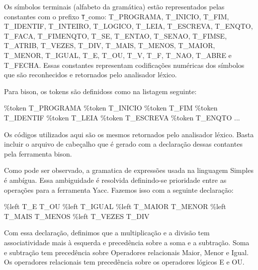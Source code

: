 \documentclass[
  brazilian,
  letterpaper,
]{book}
\newenvironment{Shaded}{\begin{snugshade}}{\end{snugshade}}
\newcommand{\NormalTok}[1]{\textcolor[rgb]{0.00,0.23,0.31}{#1}}
\newcommand{\OperatorTok}[1]{\textcolor[rgb]{0.37,0.37,0.37}{#1}}
\theoremstyle{plain}
\theoremstyle{definition}
\theoremstyle{remark}
\begin{document}
Os símbolos terminais (alfabeto da gramática) estão representados pelas
constantes com o prefixo \texttt{T\_}como: T\_PROGRAMA, T\_INICIO,
T\_FIM, T\_IDENTIF, T\_INTEIRO, T\_LOGICO, T\_LEIA, T\_ESCREVA,
T\_ENQTO, T\_FACA, T\_FIMENQTO, T\_SE, T\_ENTAO, T\_SENAO, T\_FIMSE,
T\_ATRIB, T\_VEZES, T\_DIV, T\_MAIS, T\_MENOS, T\_MAIOR, T\_MENOR,
T\_IGUAL, T\_E, T\_OU, T\_V, T\_F, T\_NAO, T\_ABRE e T\_FECHA. Essas
constantes representam codificações numéricas dos símbolos que são
reconhecidos e retornados pelo analisador léxico.

Para bison, os tokens são definidoss como na listagem seguinte:

\begin{Shaded}
\begin{Highlighting}[]
\OperatorTok{\%}\NormalTok{token T\_PROGRAMA}
\OperatorTok{\%}\NormalTok{token T\_INICIO}
\OperatorTok{\%}\NormalTok{token T\_FIM}
\OperatorTok{\%}\NormalTok{token T\_IDENTIF}
\OperatorTok{\%}\NormalTok{token T\_LEIA}
\OperatorTok{\%}\NormalTok{token T\_ESCREVA}
\OperatorTok{\%}\NormalTok{token T\_ENQTO}
\OperatorTok{...}
\end{Highlighting}
\end{Shaded}

Os códigos utilizados aqui são os mesmos retornados pelo analisador
léxico. Basta incluir o arquivo de cabeçalho que é gerado com a
declaração dessas contantes pela ferramenta bison.

Como pode ser observado, a gramatica de expressões usada na linguagem
Simples é ambígua. Essa ambiguidade é resolvida definindo-se prioridade
entre as operações para a ferramenta Yacc. Fazemos isso com a seguinte
declaração:

\begin{Shaded}
\begin{Highlighting}[]
\OperatorTok{\%}\NormalTok{left T\_E T\_OU}
\OperatorTok{\%}\NormalTok{left T\_IGUAL}
\OperatorTok{\%}\NormalTok{left T\_MAIOR T\_MENOR}
\OperatorTok{\%}\NormalTok{left T\_MAIS T\_MENOS}
\OperatorTok{\%}\NormalTok{left T\_VEZES T\_DIV}
\end{Highlighting}
\end{Shaded}

Com essa declaração, definimos que a multiplicação e a divisão tem
associatividade mais à esquerda e precedência sobre a soma e a
subtração. Soma e subtração tem precedência sobre Operadores relacionais
Maior, Menor e Igual. Os operadores relacionais tem precedência sobre os
operadores lógicos E e OU.
\end{document}
